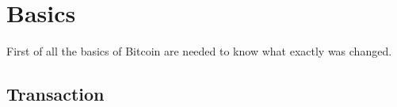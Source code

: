 
\section{Basics}
\label{ch:Basics}

First of all the basics of Bitcoin are needed to know what exactly was changed. 

\subsection{Transaction}
\label{sec:Introduction:Basics:Transaction}

